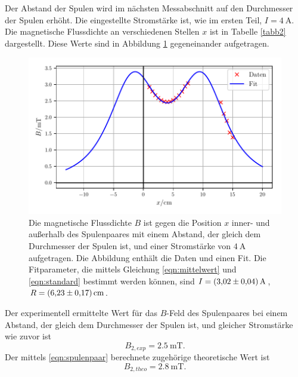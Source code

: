 \noindent Der Abstand der Spulen wird im nächsten Messabschnitt auf den
Durchmesser der Spulen erhöht.
Die eingestellte Stromstärke ist, wie im ersten Teil,
$I = \SI{4}{\ampere}$.
Die magnetische Flussdichte an verschiedenen Stellen $x$ ist
in Tabelle \ref{tabb2} dargestellt.
Diese Werte sind in Abbildung \ref{plotb2} gegeneinander %
aufgetragen.


\begin{figure}
    \centering
    \includegraphics{build/plotb2.pdf}
    \caption{Die magnetische Flussdichte $B$ ist gegen die Position $x$ inner-
    und außerhalb des Spulenpaares mit einem Abstand, der gleich dem Durchmesser
    der Spulen ist, und einer Stromstärke von $\SI{4}{\ampere}$ aufgetragen.
    Die Abbildung enthält die Daten und einen Fit.
    Die Fitparameter, die mittels Gleichung \eqref{eqn:mittelwert} und \eqref{eqn:standard}
    bestimmt werden können, sind $I = \SI{3.02 \pm 0.04}{\ampere}$, 
    $R = \SI{6.23 \pm 0.17}{\centi\meter}$.}
    \label{plotb2}
\end{figure}

\noindent Der experimentell ermittelte Wert für das $B$-Feld
des Spulenpaares bei einem Abstand, der gleich dem Durchmesser
der Spulen ist, und gleicher Stromstärke wie zuvor ist 
\begin{equation*}
   B_{2,exp} = \SI{2.5}{\milli\tesla}.
\end{equation*}
Der mittels \eqref{eqn:spulenpaar} berechnete zugehörige theoretische Wert
ist 
\begin{equation*}
   B_{2,theo} = \SI{2.8}{\milli\tesla}.
\end{equation*}

